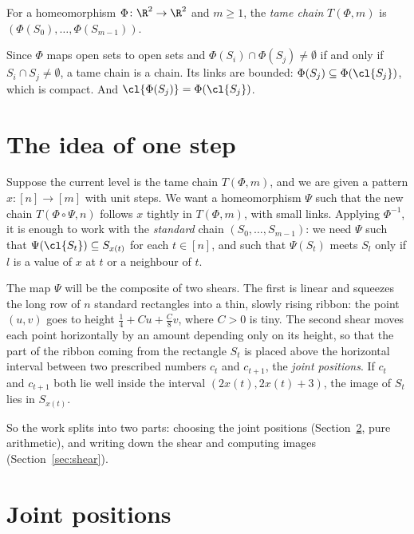 \begin{definition}\label{def:tame}
For a homeomorphism $\Phi\colon\R^2\to\R^2$ and $m\ge1$, the \emph{tame chain} $T(\Phi,m)$ is
$(\Phi(S_0),\dots,\Phi(S_{m-1}))$.
\end{definition}

Since $\Phi$ maps open sets to open sets and $\Phi(S_i)\cap\Phi(S_j)\neq\emptyset$ if and only if
$S_i\cap S_j\neq\emptyset$, a tame chain is a chain. Its links are bounded:
$\Phi(S_j)\subseteq\Phi(\cl{S_j})$, which is compact. And $\cl{\Phi(S_j)}=\Phi(\cl{S_j})$.


\section{The idea of one step}

Suppose the current level is the tame chain $T(\Phi,m)$, and we are given a pattern
$x\colon[n]\to[m]$ with unit steps. We want a homeomorphism $\Psi$ such that the new chain
$T(\Phi\circ\Psi,n)$ follows $x$ tightly in $T(\Phi,m)$, with small links. Applying $\Phi^{-1}$,
it is enough to work with the \emph{standard} chain $(S_0,\dots,S_{m-1})$: we need $\Psi$ such
that $\Psi(\cl{S_t})\subseteq S_{x(t)}$ for each $t\in[n]$, and such that $\Psi(S_t)$ meets
$S_l$ only if $l$ is a value of $x$ at $t$ or a neighbour of $t$.

The map $\Psi$ will be the composite of two shears. The first is linear and squeezes the long
row of $n$ standard rectangles into a thin, slowly rising ribbon: the point $(u,v)$ goes to
height $\frac14+Cu+\frac C8v$, where $C>0$ is tiny. The second shear moves each point
horizontally by an amount depending only on its height, so that the part of the ribbon coming
from the rectangle $S_t$ is placed above the horizontal interval between two prescribed
numbers $c_t$ and $c_{t+1}$, the \emph{joint positions}. If $c_t$ and $c_{t+1}$ both lie well
inside the interval $(2x(t),2x(t)+3)$, the image of $S_t$ lies in $S_{x(t)}$.

So the work splits into two parts: choosing the joint positions
(Section~\ref{sec:joints}, pure arithmetic), and writing down the shear and computing images
(Section~\ref{sec:shear}).

\section{Joint positions}\label{sec:joints}

